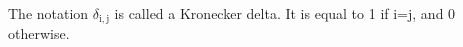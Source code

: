 The notation $ \delta_{\mathrm{i,j}} $ is called a Kronecker delta. It is equal
to 1 if i=j, and 0 otherwise.